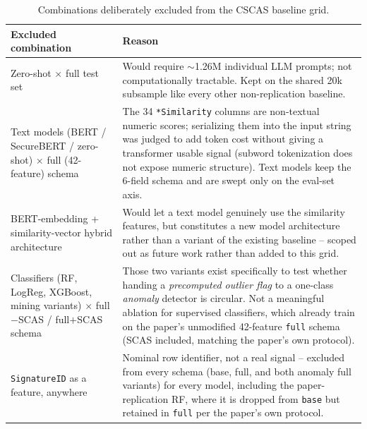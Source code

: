 \begin{table}[htbp]
\centering
\small
\caption{Combinations deliberately excluded from the CSCAS baseline grid.}
\label{tab:cscas-grid-exclusions}
\begin{tabular}{p{}p{}}
\toprule
\textbf{Excluded combination} & \textbf{Reason} \\
\midrule
Zero-shot $\times$ full test set &
Would require $\sim$1.26M individual LLM prompts; not computationally
tractable. Kept on the shared 20k subsample like every other
non-replication baseline. \\[4pt]
Text models (BERT / SecureBERT / zero-shot) $\times$ full (42-feature) schema &
The 34 \texttt{*Similarity} columns are non-textual numeric scores;
serializing them into the input string was judged to add token cost
without giving a transformer usable signal (subword tokenization does not
expose numeric structure). Text models keep the 6-field schema and are
swept only on the eval-set axis. \\[4pt]
BERT-embedding + similarity-vector hybrid architecture &
Would let a text model genuinely use the similarity features, but
constitutes a new model architecture rather than a variant of the existing
baseline -- scoped out as future work rather than added to this grid. \\[4pt]
Classifiers (RF, LogReg, XGBoost, mining variants) $\times$ full$-$SCAS /
full$+$SCAS schema &
Those two variants exist specifically to test whether handing a
\emph{precomputed outlier flag} to a one-class \emph{anomaly} detector is
circular. Not a meaningful ablation for supervised classifiers, which
already train on the paper's unmodified 42-feature \texttt{full} schema
(SCAS included, matching the paper's own protocol). \\[4pt]
\texttt{SignatureID} as a feature, anywhere &
Nominal row identifier, not a real signal -- excluded from every schema
(base, full, and both anomaly full variants) for every model, including
the paper-replication RF, where it is dropped from \texttt{base} but
retained in \texttt{full} per the paper's own protocol. \\
\bottomrule
\end{tabular}
\end{table}
